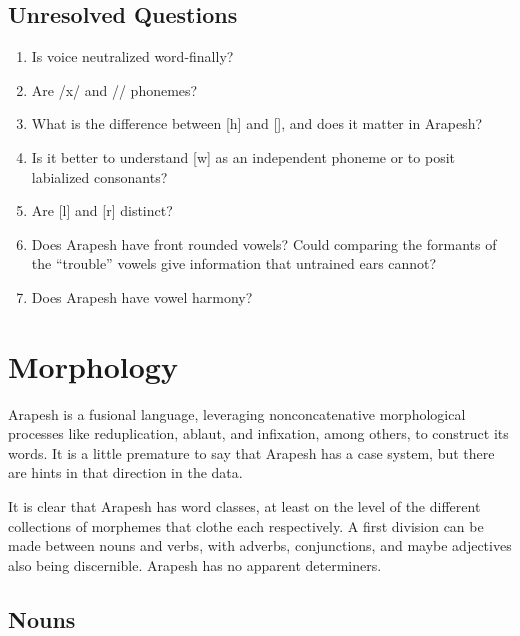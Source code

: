 \documentclass[pdftex,12pt,letterpaper]{article}
\let\ipa\textipa
\begin{document}
 \subsection{Unresolved Questions}

 \begin{enumerate}

 \item Is voice neutralized word-finally?

 \item Are /x/ and /\ipa{F}/ phonemes?

 \item What is the difference between {[h]} and {[\ipa{H}]}, and does it matter in Arapesh?

 \item Is it better to understand {[w]} as an independent phoneme or to posit labialized consonants?

 \item Are {[l]} and {[r]} distinct?

 \item Does Arapesh have front rounded vowels? Could comparing the formants of the ``trouble'' vowels give information that untrained ears cannot?

 \item Does Arapesh have vowel harmony?

 \end{enumerate}

 \section{Morphology}

 Arapesh is a fusional language, leveraging nonconcatenative morphological processes like reduplication, ablaut, and infixation, among others, to construct its words. It is a little premature to say that Arapesh has a case system, but there are hints in that direction in the data.

 It is clear that Arapesh has word classes, at least on the level of the different collections of morphemes that clothe each respectively. A first division can be made between nouns and verbs, with adverbs, conjunctions, and maybe adjectives also being discernible. Arapesh has no apparent determiners. 

 \subsection{Nouns}
\end{document}
